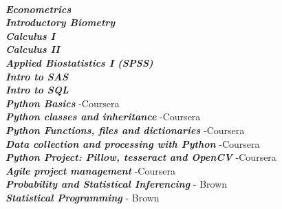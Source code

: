 \documentclass[9pt]{adeckcv} %
\begin{document}
  
  \begin{minipage}[t]{0.5\textwidth}
\vspace{-\baselineskip}
\\
\textbf{\large{\textit{Econometrics}}} \\
\textbf{\large{\textit{Introductory Biometry}}} \\
\textbf{\large{\textit{Calculus I}}} \\
\textbf{\large{\textit{Calculus II}}} \\
\textbf{\large{\textit{Applied Biostatistics I (SPSS)}}} \\
\textbf{\large{\textit{Intro to SAS}}} \\
\textbf{\large{\textit{Intro to SQL}}} \\
\textbf{\large{\textit{Python Basics}}} -Coursera \\
\textbf{\large{\textit{Python classes and inheritance}}} -Coursera \\
\textbf{\large{\textit{Python Functions, files and dictionaries}}} -Coursera \\
\textbf{\large{\textit{Data collection and processing with Python}}} -Coursera \\
\textbf{\large{\textit{Python Project: Pillow, tesseract and OpenCV}}} -Coursera \\
\textbf{\large{\textit{Agile project management}}} -Coursera \\
\textbf{\large{\textit{Probability and Statistical Inferencing}}} - Brown \\
\textbf{\large{\textit{Statistical Programming}}} - Brown \\
\end{minipage}
\hfill
\end{document}
